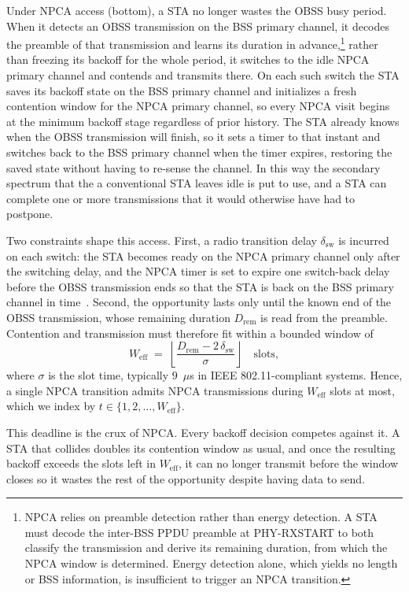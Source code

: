 \documentclass[conference]{IEEEtran}
\begin{document}
Under NPCA access (bottom), a STA no longer wastes the OBSS busy period. When it detects an OBSS transmission on the BSS primary channel, it decodes the preamble of that transmission and learns its duration in advance,\footnote{NPCA relies on preamble detection rather than energy detection. A STA must decode the inter-BSS PPDU preamble at PHY-RXSTART to both classify the transmission and derive its remaining duration, from which the NPCA window is determined. Energy detection alone, which yields no length or BSS information, is insufficient to trigger an NPCA transition.} rather than freezing its backoff for the whole period, it switches to the idle NPCA primary channel and contends and transmits there. On each such switch the STA saves its backoff state on the BSS primary channel and initializes a fresh contention window for the NPCA primary channel, so every NPCA visit begins at the minimum backoff stage regardless of prior history. The STA already knows when the OBSS transmission will finish, so it sets a timer to that instant and switches back to the BSS primary channel when the timer expires, restoring the saved state without having to re-sense the channel. In this way the secondary spectrum that the a conventional STA leaves idle is put to use, and a STA can complete one or more transmissions that it would otherwise have had to postpone.

Two constraints shape this access. First, a radio transition delay $\delta_\mathrm{sw}$ is incurred on each switch: the STA becomes ready on the NPCA primary channel only after the switching delay, and the NPCA timer is set to expire one switch-back delay before the OBSS transmission ends so that the STA is back on the BSS primary channel in time~\cite{ieee80211bn}. Second, the opportunity lasts only until the known end of the OBSS transmission, whose remaining duration $D_\mathrm{rem}$ is read from the preamble. Contention and transmission must therefore fit within a bounded window of
\begin{equation}
    W_\mathrm{eff} \;=\; \left\lfloor
    \frac{D_\mathrm{rem}-2\,\delta_\mathrm{sw}}{\sigma} \right\rfloor
    \quad\text{slots},
    \label{eq:weff}
\end{equation}
where $\sigma$ is the slot time, typically $9$~$\mu$s in IEEE 802.11-compliant systems. Hence, a single NPCA transition admits NPCA transmissions during $W_\mathrm{eff}$ slots at most, which we index by $t \in \{1, 2, \dots, W_\mathrm{eff}\}$. 

This deadline is the crux of NPCA. Every backoff decision competes against it. A STA that collides doubles its contention window as usual, and once the resulting backoff exceeds the slots left in $W_\mathrm{eff}$, it can no longer transmit before the window closes so it wastes the rest of the opportunity despite having data to send.
\end{document}
